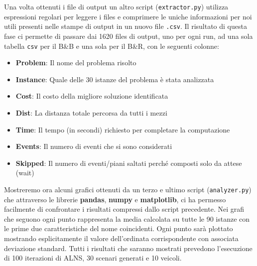 \documentclass[
    article,            %
    12pt,                %
    oneside,            %
    a4paper,            %
    english,            %
    italian,                %
    sumario=tradicional,
]{abntex2}
\begin{document}
Una volta ottenuti i file di output un altro script (\texttt{extractor.py}) utilizza espressioni regolari per leggere i files e comprimere le uniche informazioni per noi utili presenti nelle stampe di output in un nuovo file \texttt{.csv}. Il risultato di questa fase ci permette di passare dai 1620 files di output, uno per ogni run, ad una sola tabella \texttt{csv} per il B\&B e una sola per il B\&R, con le seguenti colonne: 
\begin{itemize}
    \item \textbf{Problem}: Il nome del problema risolto
    \item \textbf{Instance}: Quale delle 30 istanze del problema è stata analizzata
    \item \textbf{Cost}: Il costo della migliore soluzione identificata
    \item\textbf{Dist}: La distanza totale percorsa da tutti i mezzi
    \item\textbf{Time}: Il tempo (in secondi) richiesto per completare la computazione
    \item \textbf{Events}: Il numero di eventi che si sono considerati
    \item \textbf{Skipped}: Il numero di eventi/piani saltati perché composti solo da attese (wait)
\end{itemize}
Mostreremo ora alcuni grafici ottenuti da un terzo e ultimo script (\texttt{analyzer.py}) che attraverso le librerie \textbf{pandas}, \textbf{numpy} e \textbf{matplotlib}, ci ha permesso facilmente di confrontare i risultati compressi dallo script precedente.
Nei grafi che seguono ogni punto rappresenta la media calcolata su tutte le 90 istanze con le prime due caratteristiche del nome coincidenti. Ogni punto sarà plottato mostrando esplicitamente il valore dell'ordinata corrispondente con associata deviazione standard.
\newline
\newline
Tutti i risultati che saranno mostrati prevedono l'esecuzione di 100 iterazioni di ALNS, 30 scenari generati e 10 veicoli.
\end{document}
